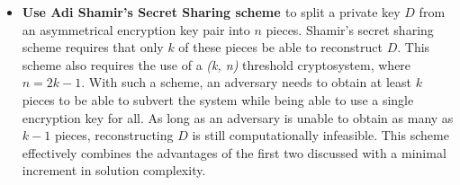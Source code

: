 \documentclass[./4_GeneralApproach.tex]{subfiles}
\begin{document}
\begin{itemize}
    \item{\textbf{Use Adi Shamir's Secret Sharing scheme \cite{Shamir1979}} to split a private key $ D $ from an asymmetrical encryption key pair into $ n $ pieces. Shamir's secret sharing scheme requires that only $ k $ of these pieces be able to reconstruct $ D $. This scheme also requires the use of a \textit{(k, n)} threshold cryptosystem, where $ n = 2k - 1 $. With such a scheme, an adversary needs to obtain at least $ k $ pieces to be able to subvert the system while being able to use a single encryption key for all. As long as an adversary is unable to obtain as many as $ k - 1 $ pieces, reconstructing $ D $ is still computationally infeasible. This scheme effectively combines the advantages of the first two discussed with a minimal increment in solution complexity.}
\end{itemize}
\end{document}
